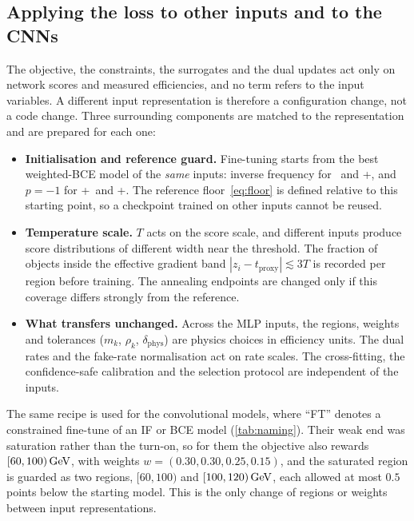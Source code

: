 \subsection{Applying the loss to other inputs and to the CNNs}
The objective, the constraints, the surrogates and the dual updates act only on network scores and measured efficiencies, and no term refers to the input variables. A different input representation is therefore a configuration change, not a code change. Three surrounding components are matched to the representation and are prepared for each one:
\begin{itemize}
  \item \textbf{Initialisation and reference guard.} Fine-tuning starts from the best weighted-BCE model of the \emph{same} inputs: inverse frequency for \CT\ and \SUM+\Ffeat, and $p=-1$ for \CP+\CT\ and \CT+\Ffeat. The reference floor~\eqref{eq:floor} is defined relative to this starting point, so a checkpoint trained on other inputs cannot be reused.
  \item \textbf{Temperature scale.} $T$ acts on the score scale, and different inputs produce score distributions of different width near the threshold. The fraction of objects inside the effective gradient band $|z_i-t_{\mathrm{proxy}}|\lesssim3T$ is recorded per region before training. The annealing endpoints are changed only if this coverage differs strongly from the reference.
  \item \textbf{What transfers unchanged.} Across the MLP inputs, the regions, weights and tolerances ($m_k$, $\rho_k$, $\delta_{\mathrm{phys}}$) are physics choices in efficiency units. The dual rates and the fake-rate normalisation act on rate scales. The cross-fitting, the confidence-safe calibration and the selection protocol are independent of the inputs.
\end{itemize}
The same recipe is used for the convolutional models, where ``FT'' denotes a constrained fine-tune of an IF or BCE model (\cref{tab:naming}). Their weak end was saturation rather than the turn-on, so for them the objective also rewards $[60,100)\,\mathrm{GeV}$, with weights $w=(0.30,0.30,0.25,0.15)$, and the saturated region is guarded as two regions, $[60,100)$ and $[100,120)\,\mathrm{GeV}$, each allowed at most $0.5$ points below the starting model. This is the only change of regions or weights between input representations.

